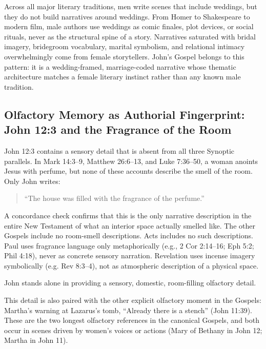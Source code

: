 Across all major literary traditions, men write scenes that include weddings, but they do not build narratives around weddings.
From Homer to Shakespeare to modern film, male authors use weddings as comic finales, plot devices, or social rituals, never as the structural spine of a story.
Narratives saturated with bridal imagery, bridegroom vocabulary, marital symbolism, and relational intimacy overwhelmingly come from female storytellers.
John's Gospel belongs to this pattern: it is a wedding-framed, marriage-coded narrative whose thematic architecture matches a female literary instinct rather than any known male tradition.

\subsection{Olfactory Memory as Authorial Fingerprint: John 12:3 and the Fragrance of the Room}\label{subsec:the-anointing-of-jesus-by-a-woman-with-expensive-perfume-john-123-mark-143-9}

John 12:3 contains a sensory detail that is absent from all three Synoptic parallels.
In Mark 14:3--9, Matthew 26:6--13, and Luke 7:36--50, a woman anoints Jesus with perfume, but none of these accounts describe the smell of the room.
Only John writes:

\begin{quote}
``The house was filled with the fragrance of the perfume.''
\end{quote}

A concordance check confirms that this is the only narrative description in the entire New Testament of what an interior space actually smelled like.
The other Gospels include no room-smell descriptions.
Acts includes no such descriptions.
Paul uses fragrance language only metaphorically (e.g., 2 Cor 2:14--16; Eph 5:2; Phil 4:18), never as concrete sensory narration.
Revelation uses incense imagery symbolically (e.g. Rev 8:3--4), not as atmospheric description of a physical space.

John stands alone in providing a sensory, domestic, room-filling olfactory detail.

This detail is also paired with the other explicit olfactory moment in the Gospels: Martha's warning at Lazarus's tomb, ``Already there is a stench'' (John 11:39).
These are the two longest olfactory references in the canonical Gospels, and both occur in scenes driven by women's voices or actions (Mary of Bethany in John 12; Martha in John 11).


